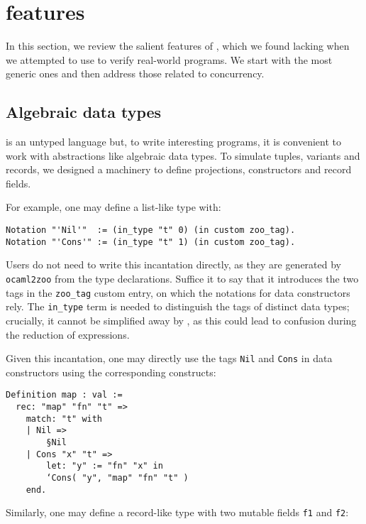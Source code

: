 \section{\Zoo features}
\label{sec:features}

In this section, we review the salient features of \Zoo, which we found lacking when we attempted to use \HeapLang to verify real-world \OCaml programs.
We start with the most generic ones and then address those related to concurrency.

\subsection{Algebraic data types}

\Zoo is an untyped language but, to write interesting programs, it is convenient to work with abstractions like algebraic data types.
To simulate tuples, variants and records, we designed a machinery to define projections, constructors and record fields.

For example, one may define a list-like type with:

\begin{verbatim}
Notation "'Nil'"  := (in_type "t" 0) (in custom zoo_tag).
Notation "'Cons'" := (in_type "t" 1) (in custom zoo_tag).
\end{verbatim}

Users do not need to write this incantation directly, as they are generated by \texttt{ocaml2zoo} from the \OCaml type declarations.
Suffice it to say that it introduces the two tags in the \texttt{zoo\_tag} custom entry, on which the notations for data constructors rely.
The \texttt{in_type} term is needed to distinguish the tags of distinct data types; crucially, it cannot be simplified away by \Rocq, as this could lead to confusion during the reduction of expressions.

Given this incantation, one may directly use the tags \texttt{Nil} and \texttt{Cons} in data constructors using the corresponding \ZooLang constructs:

\begin{verbatim}
Definition map : val :=
  rec: "map" "fn" "t" =>
    match: "t" with
    | Nil =>
        §Nil
    | Cons "x" "t" =>
        let: "y" := "fn" "x" in
        ‘Cons( "y", "map" "fn" "t" )
    end.
\end{verbatim}

Similarly, one may define a record-like type with two mutable fields \texttt{f1} and \texttt{f2}:

